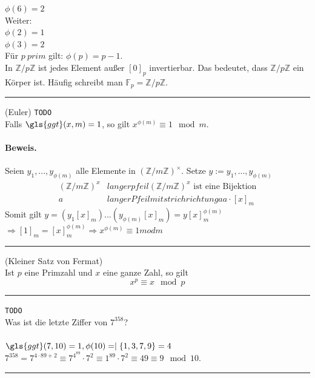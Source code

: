 \documentclass[9pt]{article}
\begin{document}
\begin{bsp}
$\phi(6) = 2$\\
Weiter: \\
$\phi(2) = 1$ \\
$\phi(3) = 2$ \\
Für $p \ prim$  gilt: $\phi(p) = p-1$.\\
In $\mathbb{Z} / p \mathbb{Z}$ ist jedes Element außer $[0]_p$ invertierbar. Das bedeutet, dass $\mathbb{Z} / p \mathbb{Z}$ ein \Gls{Körper} ist. Häufig schreibt man $\mathbb{F}_p = \mathbb{Z} / p \mathbb{Z}$. 
\end{bsp} \noindent \rule{8cm}{0.4pt}
\begin{satz} (Euler) \texttt{TODO} \\ 
Falls $\gls{ggt}(x,m) = 1$, so gilt $x^{\phi (m)} \equiv 1 \mod m$.\\
\paragraph{Beweis.} 
Seien $y_1, ..., y_{\phi(m)}$ alle Elemente in $(\mathbb{Z} / m \mathbb{Z})^{\times}$. Setze $y := y_1, ..., y_{\phi(m)}$
\begin{align*}
    (\mathbb{Z} / m \mathbb{Z})^x & langerpfeil (\mathbb{Z} / m \mathbb{Z})^x  \text{ ist eine Bijektion}\\
    a & langerPfeilmitstrichrichtunga a \cdot [x]_m
\end{align*}
Somit gilt $ y = (y_1 [x]_m) ... (y_{\phi(m)}[x]_m) = y [x]_m^{\phi(m)}$ \\
$\Rightarrow [1]_m = [x]_m^{\phi(m)} \Rightarrow x^{\phi(m)} \equiv 1 mod m$
 \end{satz} \noindent \rule{8cm}{0.4pt}
\begin{folg}
(Kleiner Satz von Fermat) \\
Ist $p$ eine Primzahl und $x$ eine ganze Zahl, so gilt
\[x^p \equiv x \mod p\]
\end{folg} \noindent \rule{8cm}{0.4pt}
\begin{bsp} \texttt{TODO}
\\
Was ist die letzte Ziffer von $7^{358}$? \\
\\
$\gls{ggt}(7,10) = 1, \phi(10) = \mid \{1,3,7,9\} = 4$ \\
$7^{358} = 7^{4 \cdot 89 +2} \equiv  7^{4^{89}} \cdot 7^{2} \equiv 1^{89} \cdot 7^{2} \equiv 49 \equiv  9 \mod 10$.
\end{bsp} \noindent \rule{8cm}{0.4pt}
\end{document}
